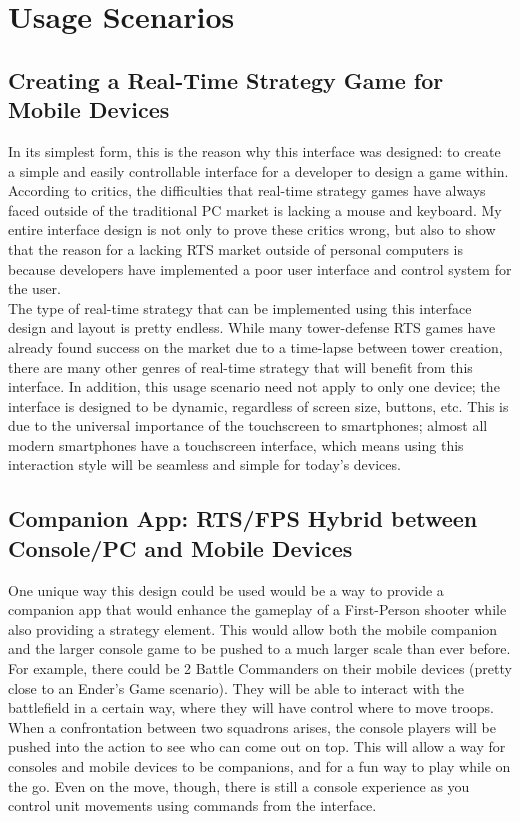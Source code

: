 \documentclass[11pt]{article}
\begin{document}
\section{Usage Scenarios}
	\subsection{Creating a Real-Time Strategy Game for Mobile Devices}
	In its simplest form, this is the reason why this interface was designed: to create a simple and easily controllable interface for a developer to design a game within. According to critics, the difficulties that real-time strategy games have always faced outside of the traditional PC market is lacking a mouse and keyboard. My entire interface design is not only to prove these critics wrong, but also to show that the reason for a lacking RTS market outside of personal computers is because developers have implemented a poor user interface and control system for the user. \\
	\indent The type of real-time strategy that can be implemented using this interface design and layout is pretty endless. While many tower-defense RTS games have already found success on the market due to a time-lapse between tower creation, there are many other genres of real-time strategy that will benefit from this interface. In addition, this usage scenario need not apply to only one device; the interface is designed to be dynamic, regardless of screen size, buttons, etc. This is due to the universal importance of the touchscreen to smartphones; almost all modern smartphones have a touchscreen interface, which means using this interaction style will be seamless and simple for today's devices.
	\subsection{Companion App: RTS/FPS Hybrid between Console/PC and Mobile Devices}
	One unique way this design could be used would be a way to provide a companion app that would enhance the gameplay of a First-Person shooter while also providing a strategy element. This would allow both the mobile companion and the larger console game to be pushed to a much larger scale than ever before. For example, there could be 2 Battle Commanders on their mobile devices (pretty close to an Ender's Game scenario). They will be able to interact with the battlefield in a certain way, where they will have control where to move troops. When a confrontation between two squadrons arises, the console players will be pushed into the action to see who can come out on top. This will allow a way for consoles and mobile devices to be companions, and for a fun way to play while on the go. Even on the move, though, there is still a console experience as you control unit movements using commands from the interface.
\end{document}
